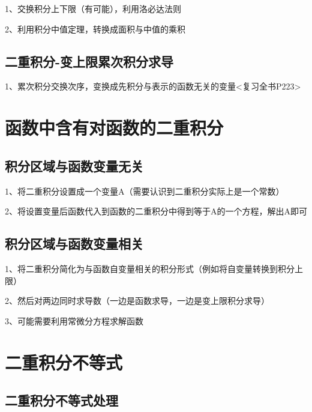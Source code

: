 1、交换积分上下限（有可能），利用洛必达法则

2、利用积分中值定理，转换成面积与中值的乘积



\subsection{二重积分-变上限累次积分求导}

1、累次积分交换次序，变换成先积分与表示的函数无关的变量<复习全书P223>

\section{函数中含有对函数的二重积分}



\subsection{积分区域与函数变量无关}

1、将二重积分设置成一个变量A（需要认识到二重积分实际上是一个常数）

2、将设置变量后函数代入到函数的二重积分中得到等于A的一个方程，解出A即可



\subsection{积分区域与函数变量相关}

1、将二重积分简化为与函数自变量相关的积分形式（例如将自变量转换到积分上限）

2、然后对两边同时求导数（一边是函数求导，一边是变上限积分求导）

3、可能需要利用常微分方程求解函数

\section{二重积分不等式}



\subsection{二重积分不等式处理}

